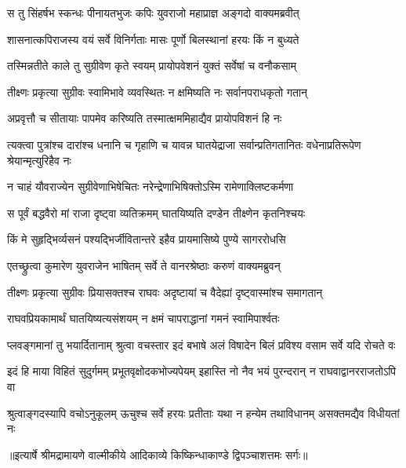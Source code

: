 \twolineshloka
{स तु सिंहर्षभ स्कन्धः पीनायतभुजः कपिः}
{युवराजो महाप्राज्ञ अङ्गदो वाक्यमब्रवीत्} %

\twolineshloka
{शासनात्कपिराजस्य वयं सर्वे विनिर्गताः}
{मासः पूर्णो बिलस्थानां हरयः किं न बुध्यते} %

\twolineshloka
{तस्मिन्नतीते काले तु सुग्रीवेण कृते स्वयम्}
{प्रायोपवेशनं युक्तं सर्वेषां च वनौकसाम्} %

\twolineshloka
{तीक्ष्णः प्रकृत्या सुग्रीवः स्वामिभावे व्यवस्थितः}
{न क्षमिष्यति नः सर्वानपराधकृतो गतान्} %

\twolineshloka
{अप्रवृत्तौ च सीतायाः पापमेव करिष्यति}
{तस्मात्क्षममिहाद्यैव प्रायोपविशनं हि नः} %

\threelineshloka
{त्यक्त्वा पुत्रांश्च दारांश्च धनानि च गृहाणि च}
{यावन्न घातयेद्राजा सर्वान्प्रतिगतानितः}
{वधेनाप्रतिरूपेण श्रेयान्मृत्युरिहैव नः} %

\twolineshloka
{न चाहं यौवराज्येन सुग्रीवेणाभिषेचितः}
{नरेन्द्रेणाभिषिक्तोऽस्मि रामेणाक्लिष्टकर्मणा} %

\twolineshloka
{स पूर्वं बद्धवैरो मां राजा दृष्ट्वा व्यतिक्रमम्}
{घातयिष्यति दण्डेन तीक्ष्णेन कृतनिश्चयः} %

\twolineshloka
{किं मे सुहृद्भिर्व्यसनं पश्यद्भिर्जीवितान्तरे}
{इहैव प्रायमासिष्ये पुण्ये सागररोधसि} %

\twolineshloka
{एतच्छ्रुत्वा कुमारेण युवराजेन भाषितम्}
{सर्वे ते वानरश्रेष्ठाः करुणं वाक्यमब्रुवन्} %

\twolineshloka
{तीक्ष्णः प्रकृत्या सुग्रीवः प्रियासक्तश्च राघवः}
{अदृष्टायां च वैदेह्यां दृष्ट्वास्मांश्च समागतान्} %

\twolineshloka
{राघवप्रियकामार्थं घातयिष्यत्यसंशयम्}
{न क्षमं चापराद्धानां गमनं स्वामिपार्श्वतः} %

\fourlineindentedshloka
{प्लवङ्गमानां तु भयार्दितानाम्}
{श्रुत्वा वचस्तार इदं बभाषे}
{अलं विषादेन बिलं प्रविश्य}
{वसाम सर्वे यदि रोचते वः} %

\fourlineindentedshloka
{इदं हि माया विहितं सुदुर्गमम्}
{प्रभूतवृक्षोदकभोज्यपेयम्}
{इहास्ति नो नैव भयं पुरन्दरान्}
{न राघवाद्वानरराजतोऽपि वा} %

\fourlineindentedshloka
{श्रुत्वाङ्गदस्यापि वचोऽनुकूलम्}
{ऊचुश्च सर्वे हरयः प्रतीताः}
{यथा न हन्येम तथाविधानम्}
{असक्तमद्यैव विधीयतां नः} %


{॥इत्यार्षे श्रीमद्रामायणे वाल्मीकीये आदिकाव्ये किष्किन्धाकाण्डे द्विपञ्चाशत्तमः सर्गः॥}

